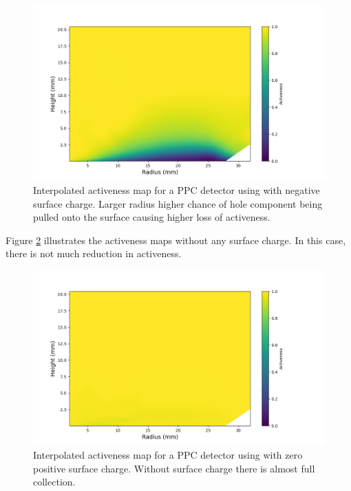 \begin{figure}%
\includegraphics[trim={1.4cm 0.5cm 3.2cm 1.755cm},clip,width=0.9\linewidth]{ch5/figs/activeness_map_cubic_sc=-0.3_ponama_1_5000.png}
\caption{Interpolated activeness map for a PPC detector using \ehd with negative surface charge. Larger radius higher chance of hole component being pulled onto the surface causing higher loss of activeness.}
\label{ch5_fig_activeness_map_neg}
\end{figure}

Figure \ref{ch5_fig_interpolated_activeness_map_0} illustrates the activeness maps without any surface charge. In this case, there is not much reduction in activeness. 

\begin{figure}%
\includegraphics[trim={1.5cm 0cm 3.3cm 1cm},clip,width=0.9\linewidth]{ch5/figs/activeness_map_cubic_sc=0_ponama_1_5000.png}
\caption{Interpolated activeness map for a PPC detector using \ehd with zero positive surface charge. Without surface charge there is almost full collection.}
\label{ch5_fig_interpolated_activeness_map_0}
\end{figure}

